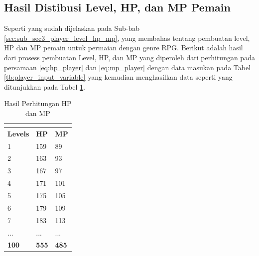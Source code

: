 \subsection{Hasil Distibusi Level, HP, dan MP Pemain}
\label{sec:sub_sec4_eval_dist_hp_mp_level_single-character}
\vspace{1ex}

Seperti yang sudah dijelaskan pada Sub-bab \ref{sec:sub_sec3_player_level_hp_mp}, yang membahas tentang pembuatan level, HP dan MP pemain untuk permaian dengan genre RPG. Berikut adalah hasil dari prosess pembuatan Level, HP, dan MP yang diperoleh dari perhitungan pada persamaan \ref{eq:hp_player} dan \ref{eq:mp_player} dengan data masukan pada Tabel \ref{tb:player_input_variable} yang kemudian menghasilkan data seperti yang ditunjukkan pada Tabel \ref{tb:player_hp_mp}.

\begin{longtable}{|l|l|l|}
	\caption{Hasil Perhitungan HP dan MP}
	\vspace{1ex}
	\label{tb:player_hp_mp}\\
	\hline
	\rowcolor[HTML]{C0C0C0} 
	\textbf{Levels} & \textbf{HP} & \textbf{MP} \\ \hline
	1 & 159 & 89 \\ \hline
	2 & 163 & 93 \\ \hline
	3 & 167 & 97 \\ \hline
	4 & 171 & 101 \\ \hline
	5 & 175 & 105 \\ \hline
	6 & 179 & 109 \\ \hline
	7 & 183 & 113 \\ \hline
	... & ... & ... \\ \hline
	\textbf{100} & \textbf{555} & \textbf{485} \\ \hline
\end{longtable}
\vspace{1ex}

